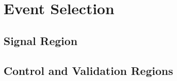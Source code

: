
\chapter{Event Selection} %

\label{ch:eventsel} 


\section{Signal Region}
\section{Control and Validation Regions}


